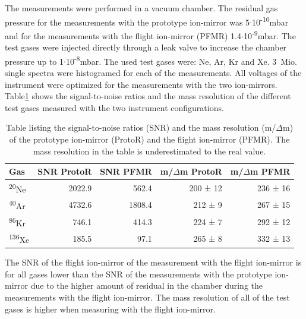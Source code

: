 	The measurements were performed in a vacuum chamber. The residual gas pressure for the measurements with the prototype ion-mirror was 5$\cdot$10\textsuperscript{-10}mbar and for the measurements with the flight ion-mirror (PFMR) 1.4$\cdot$10\textsuperscript{-9}mbar. The test gases were injected directly through a leak valve to increase the chamber pressure up to 1$\cdot$10\textsuperscript{-8}mbar. The used test gases were: Ne, Ar, Kr and Xe. 3\, Mio. single spectra were histogramed for each of the measurements. All voltages of the instrument were optimized for the measurements with the two ion-mirrors. Table\ref{tab:refPerftab} shows the signal-to-noise ratios and the mass resolution of the different test gases measured with the two instrument configurations.\\
	\begin{table}
		\begin{center}
		\begin{tabular}{|l|r|r|r|r|}
			\hline
			Gas						&SNR ProtoR	&SNR PFMR	&m/$\Delta$m ProtoR	&m/$\Delta$m PFMR\\
			\hline
			\textsuperscript{20}Ne	&2022.9		&562.4		&200 ± 12		&236 ± 16\\
			\textsuperscript{40}Ar	&4732.6		&1808.4		&212 ±  9		&267 ± 15\\
			\textsuperscript{86}Kr	&746.1		&414.3		&224 ±  7		&292 ± 12\\
			\textsuperscript{136}Xe	&185.5		&97.1		&265 ±  8		&332 ± 13\\
			\hline
		\end{tabular}
		\end{center}
		\caption{Table listing the signal-to-noise ratios (SNR) and the mass resolution (m/$\Delta$m) of the prototype ion-mirror (ProtoR) and the flight ion-mirror (PFMR). The mass resolution in the table is underestimated to the real value.}
		\label{tab:refPerftab}
	\end{table}
	The SNR of the flight ion-mirror of the measurement with the flight ion-mirror is for all gases lower than the SNR of the measurements with the prototype ion-mirror due to the higher amount of residual in the chamber during the measurements with the flight ion-mirror. The mass resolution of all of the test gases is higher when measuring with the flight ion-mirror.
	
